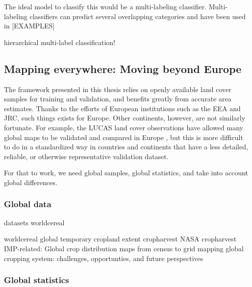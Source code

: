                 The ideal model to classify this would be a multi-labeling classifier. Multi-labeling classifiers can predict several overlapping categories and have been used in [EXAMPLES]

        hierarchical multi-label classification!
        
    \subsection{Mapping everywhere: Moving beyond Europe}

        The framework presented in this thesis relies on openly available land cover samples for training and validation, and benefits greatly from accurate area estimates. Thanks to the efforts of European institutions such as the EEA and JRC, such things exists for Europe. Other continents, however, are not similarly fortunate. For example, the LUCAS land cover observations \citep{dandrimont2020harmonised} have allowed many global maps to be validated and compared in Europe \citep{gao2020consistency,venter2022global}, but this is more difficult to do in a standardized way in countries and continents that have a less detailed, reliable, or otherwise representative validation dataset.
        
        For that to work, we need global samples, global statistics, and take into account global differences.
        
        \subsubsection{Global data}
        
        datasets
        worldcereal \citep{boogaard2023worldcereal}

        worldcereal global temporary cropland extent \citep{lesiv2023global} %
        cropharvest
        NASA cropharvest \citep{tseng2021cropharvest} %
        IMP-related: Global crop distribution maps from census to grid \citep{you2014generating}
        mapping global cropping system: challenges, opportunties, and future perspectives \citep{you2022mapping}

        \subsubsection{Global statistics}

